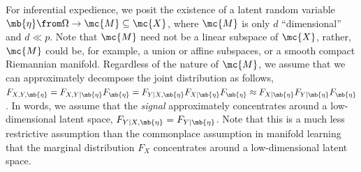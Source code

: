 For inferential expedience, we  posit the existence of  a latent random variable $\mb{\eta} \from \Omega \to \mc{M} \subseteq \mc{X}$, where $\mc{M}$ is only $d$ ``dimensional'' and $d \ll p$.   
Note that $\mc{M}$ need not be a linear subspace of $\mc{X}$, rather, $\mc{M}$ could be, for example,  a union or affine subspaces, or a smooth compact Riemannian manifold.  Regardless of the nature of $\mc{M}$, we assume that we can approximately decompose the joint distribution as follows,  $F_{X,Y,\mb{\eta}}=F_{X,Y|\mb{\eta}}F_{\mb{\eta}} = F_{Y|X, \mb{\eta}} F_{X | \mb{\eta}} F_{\mb{\eta}} \approx F_{X|\mb{\eta}} F_{Y|\mb{\eta}} F_{\mb{\eta}}$.  In  words, we assume that the \emph{signal} approximately concentrates around a low-dimensional latent space, $F_{Y|X,\mb{\eta}}=F_{Y|\mb{\eta}}$.  Note that this is a much less restrictive assumption than the commonplace assumption in manifold learning that the marginal distribution $F_X$ concentrates around a low-dimensional latent space.  %



